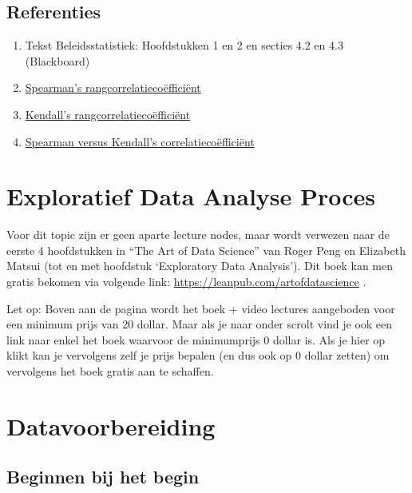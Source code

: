 \documentclass[]{memoir}
\providecommand{\tightlist}{%
  \setlength{\itemsep}{0pt}\setlength{\parskip}{0pt}}
\begin{document}
\section*{Referenties}\label{referenties-2}

\begin{enumerate}
\def\labelenumi{\arabic{enumi}.}
\tightlist
\item
  Tekst Beleidsstatistiek: Hoofdstukken 1 en 2 en secties 4.2 en 4.3
  (Blackboard)
\item
  \href{https://nl.wikipedia.org/wiki/Spearmans_rangcorrelatieco\%C3\%ABffici\%C3\%ABnt}{Spearman's
  rangcorrelatiecoëfficiënt}
\item
  \href{https://nl.wikipedia.org/wiki/Kendalls_tau}{Kendall's
  rangcorrelatiecoëfficiënt}
\item
  \href{https://www.researchgate.net/post/Does_Spearmans_rho_have_any_advantage_over_Kendalls_tau}{Spearman
  versus Kendall's correlatiecoëfficiënt}
\end{enumerate}

\chapter{Exploratief Data Analyse
Proces}\label{exploratief-data-analyse-proces}

Voor dit topic zijn er geen aparte lecture nodes, maar wordt verwezen
naar de eerste 4 hoofdstukken in ``The Art of Data Science'' van Roger
Peng en Elizabeth Matsui (tot en met hoofdstuk `Exploratory Data
Analysis'). Dit boek kan men gratis bekomen via volgende link:
\url{https://leanpub.com/artofdatascience} .

Let op: Boven aan de pagina wordt het boek + video lectures aangeboden
voor een minimum prijs van 20 dollar. Maar als je naar onder scrolt vind
je ook een link naar enkel het boek waarvoor de minimumprijs 0 dollar
is. Als je hier op klikt kan je vervolgens zelf je prijs bepalen (en dus
ook op 0 dollar zetten) om vervolgens het boek gratis aan te schaffen.

\chapter{Datavoorbereiding}\label{datavoorbereiding}

\section{Beginnen bij het begin}\label{beginnen-bij-het-begin}
\end{document}
